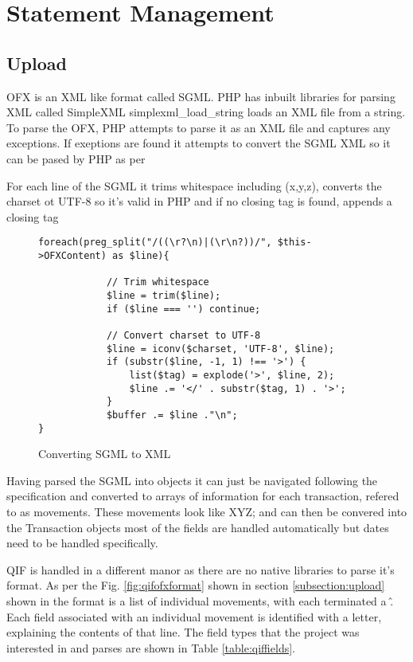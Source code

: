 \section[Statements]{Statement Management}

\subsection{Upload}
OFX is an XML like format called SGML. PHP has inbuilt libraries for parsing XML called SimpleXML simplexml\_load\_string loads an XML file from a string. To parse the OFX, PHP attempts to parse it as an XML file and captures any exceptions. If exeptions are found it attempts to convert the SGML XML so it can be pased by PHP as per 



For each line of the SGML it trims whitespace including (x,y,z), converts the charset ot UTF-8 so it's valid in PHP and if no closing tag is found, appends a closing tag

\begin{figure}
\lstset{style=phpcolor}
\begin{lstlisting}
foreach(preg_split("/((\r?\n)|(\r\n?))/", $this->OFXContent) as $line){
        		
        	// Trim whitespace
        	$line = trim($line);
        	if ($line === '') continue;
        
        	// Convert charset to UTF-8
        	$line = iconv($charset, 'UTF-8', $line);
        	if (substr($line, -1, 1) !== '>') {
        		list($tag) = explode('>', $line, 2);
        		$line .= '</' . substr($tag, 1) . '>';
        	}
        	$buffer .= $line ."\n";
}
\end{lstlisting}
\caption{Converting SGML to XML}
\end{figure}

Having parsed the SGML into objects it can just be navigated following the specification and converted to arrays of information for each transaction, refered to as movements. These movements look like XYZ; and can then be convered into the Transaction objects most of the fields are handled automatically but dates need to be handled specifically.

QIF is handled in a different manor as there are no native libraries to parse it's format. As per the Fig. \ref{fig:qifofxformat} shown in section \ref{subsection:upload} shown in  the format is a list of individual movements, with each terminated a \^. Each field associated with an individual movement is identified with a letter, explaining the contents of that line.
% 
The field types that the project was interested in and parses are shown in Table \ref{table:qiffields}.

